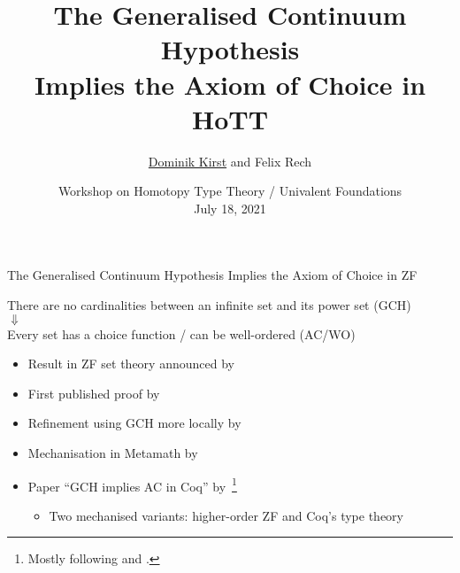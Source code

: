 \documentclass[xcolor=dvipsnames,compress,aspectratio=169,handout]{beamer}
\title[GCH Implies AC in HoTT]{The Generalised Continuum Hypothesis\\Implies the Axiom of Choice in HoTT}
\author[\underline{Dominik Kirst} and Felix Rech]{\underline{Dominik Kirst} and Felix Rech}
\date[HoTT/UF'21]{Workshop on Homotopy Type Theory / Univalent Foundations\\July 18, 2021}
\newcommand{\nologo}{\setbeamertemplate{logo}{}} %
\begin{document}
\renewcommand{\emph}[1]{\textcolor{sb@mcyan}{#1}}

\newcommand\refs[1]{%
	\begin{textblock*}{8cm}(0.3cm,9.2cm)%
		\scriptsize {\color{gray}#1}
	\end{textblock*}
}



\nologo
\begin{frame}
	\maketitle
\end{frame}

\let\footnoterule\relax

\begin{frame}{The Generalised Continuum Hypothesis Implies the Axiom of Choice in ZF}
	\pause
	\begin{centering}
		\begin{widerbox}
			\center
			There are no cardinalities between an infinite set and its power set (GCH)\\
			\vspace{0.1cm}
			$\Downarrow$\\
			\vspace{0.1cm}
			Every set has a choice function / can be well-ordered (AC/WO)
		\end{widerbox}
	\end{centering}

	\pause
	\vspace{0.2cm}
	\begin{itemize}
		\item
		Result in ZF set theory announced by~\cite{lindenbaum_communication_1926}
		\vspace{0.1cm}
		\item
		First published proof by~\cite{sierpinski1947}
		\vspace{0.1cm}
		\item
		Refinement using GCH more locally by~\cite{specker_verallgemeinerte_1990}
		\pause
		\vspace{0.2cm}
		\item
		Mechanisation in Metamath by~\cite{carneiro_gch_2015}
		\vspace{0.1cm}
		\item
		Paper ``GCH implies AC in Coq'' by~\cite{kirst2021generalised}\footnote<4->{Mostly following \cite{gillman2002} and \cite{smullyan2010}.}
		\begin{itemize}
			\item
			Two mechanised variants: higher-order ZF and Coq's type theory
		\end{itemize}
	\end{itemize}
\end{frame}
\end{document}
